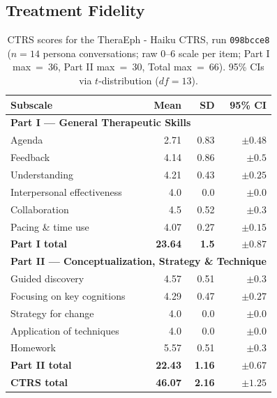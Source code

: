 \documentclass[twoside]{report}
\begin{document}
\subsection{Treatment Fidelity}
\begin{table}[ht]
\centering
\caption{CTRS scores for the TheraEph - Haiku CTRS, run \texttt{098bcce8} ($n = 14$ persona conversations; raw 0--6 scale per item; Part I max~=~36, Part II max~=~30, Total max~=~66). 95\% CIs via $t$-distribution ($df = 13$).}
\label{tab:ctrs_098bcce8}
\begin{tabular}{|l|r|r|r|}
\hline
\textbf{Subscale} & \textbf{Mean} & \textbf{SD} & \textbf{95\% CI} \\
\hline
\hline
\multicolumn{4}{|l|}{\textbf{Part I --- General Therapeutic Skills}} \\
\hline
Agenda & 2.71 & 0.83 & $\pm 0.48$ \\
\hline
Feedback & 4.14 & 0.86 & $\pm 0.5$ \\
\hline
Understanding & 4.21 & 0.43 & $\pm 0.25$ \\
\hline
Interpersonal effectiveness & 4.0 & 0.0 & $\pm 0.0$ \\
\hline
Collaboration & 4.5 & 0.52 & $\pm 0.3$ \\
\hline
Pacing \& time use & 4.07 & 0.27 & $\pm 0.15$ \\
\hline
\textbf{Part I total} & \textbf{23.64} & \textbf{1.5} & $\mathbf{\pm 0.87}$ \\
\hline
\hline
\multicolumn{4}{|l|}{\textbf{Part II --- Conceptualization, Strategy \& Technique}} \\
\hline
Guided discovery & 4.57 & 0.51 & $\pm 0.3$ \\
\hline
Focusing on key cognitions & 4.29 & 0.47 & $\pm 0.27$ \\
\hline
Strategy for change & 4.0 & 0.0 & $\pm 0.0$ \\
\hline
Application of techniques & 4.0 & 0.0 & $\pm 0.0$ \\
\hline
Homework & 5.57 & 0.51 & $\pm 0.3$ \\
\hline
\textbf{Part II total} & \textbf{22.43} & \textbf{1.16} & $\mathbf{\pm 0.67}$ \\
\hline
\hline
\textbf{CTRS total} & \textbf{46.07} & \textbf{2.16} & $\mathbf{\pm 1.25}$ \\
\hline
\end{tabular}
\end{table}
\end{document}
